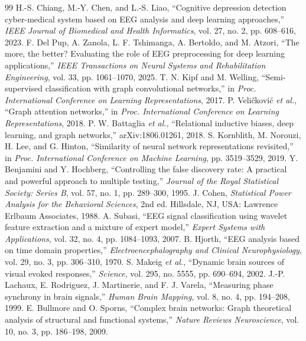 \documentclass[journal]{IEEEtran}
\begin{document}
\begin{thebibliography}{99}
 H.-S. Chiang, M.-Y. Chen, and L.-S. Liao, ``Cognitive depression detection cyber-medical system based on EEG analysis and deep learning approaches,'' \emph{IEEE Journal of Biomedical and Health Informatics}, vol. 27, no. 2, pp. 608--616, 2023.
 F. Del Pup, A. Zanola, L. F. Tshimanga, A. Bertoldo, and M. Atzori, ``The more, the better? Evaluating the role of EEG preprocessing for deep learning applications,'' \emph{IEEE Transactions on Neural Systems and Rehabilitation Engineering}, vol. 33, pp. 1061--1070, 2025.
 T. N. Kipf and M. Welling, ``Semi-supervised classification with graph convolutional networks,'' in \emph{Proc. International Conference on Learning Representations}, 2017.
 P. Veli\v{c}kovi\'{c} \emph{et al.}, ``Graph attention networks,'' in \emph{Proc. International Conference on Learning Representations}, 2018.
 P. W. Battaglia \emph{et al.}, ``Relational inductive biases, deep learning, and graph networks,'' arXiv:1806.01261, 2018.
 S. Kornblith, M. Norouzi, H. Lee, and G. Hinton, ``Similarity of neural network representations revisited,'' in \emph{Proc. International Conference on Machine Learning}, pp. 3519--3529, 2019.
 Y. Benjamini and Y. Hochberg, ``Controlling the false discovery rate: A practical and powerful approach to multiple testing,'' \emph{Journal of the Royal Statistical Society: Series B}, vol. 57, no. 1, pp. 289--300, 1995.
 J. Cohen, \emph{Statistical Power Analysis for the Behavioral Sciences}, 2nd ed. Hillsdale, NJ, USA: Lawrence Erlbaum Associates, 1988.
 A. Subasi, ``EEG signal classification using wavelet feature extraction and a mixture of expert model,'' \emph{Expert Systems with Applications}, vol. 32, no. 4, pp. 1084--1093, 2007.
 B. Hjorth, ``EEG analysis based on time domain properties,'' \emph{Electroencephalography and Clinical Neurophysiology}, vol. 29, no. 3, pp. 306--310, 1970.
 S. Makeig \emph{et al.}, ``Dynamic brain sources of visual evoked responses,'' \emph{Science}, vol. 295, no. 5555, pp. 690--694, 2002.
 J.-P. Lachaux, E. Rodriguez, J. Martinerie, and F. J. Varela, ``Measuring phase synchrony in brain signals,'' \emph{Human Brain Mapping}, vol. 8, no. 4, pp. 194--208, 1999.
 E. Bullmore and O. Sporns, ``Complex brain networks: Graph theoretical analysis of structural and functional systems,'' \emph{Nature Reviews Neuroscience}, vol. 10, no. 3, pp. 186--198, 2009.

\end{thebibliography}
\end{document}
